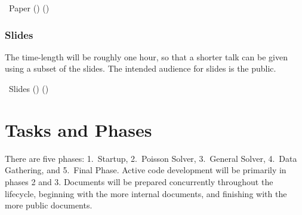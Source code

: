 \documentclass[11pt]{article}
\begin{document}
\BeginENUMERATE
  \item  \amrSolve\ Paper    () ()
\EndENUMERATE


\subsubsection{Slides} \label{sss:slides}

The time-length will be roughly one hour, so that a shorter talk can
be given using a subset of the slides.  The intended audience for
slides is the public.

\BeginENUMERATE
  \item  \amrSolve\ Slides   () ()
\EndENUMERATE

\section{Tasks and Phases}

There are five phases: 1.~Startup, 2.~Poisson Solver, 3.~General
Solver, 4.~Data Gathering, and 5.~Final Phase.  Active code
development will be primarily in phases 2 and 3.  Documents will be
prepared concurrently throughout the lifecycle, beginning with the
more internal documents, and finishing with the more public documents.
\end{document}
